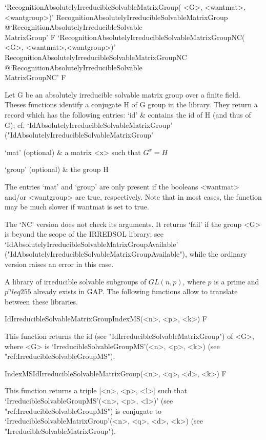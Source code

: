 \>`RecognitionAbsolutelyIrreducibleSolvableMatrixGroup(%
   <G>, <wantmat>, <wantgroup>)'%
{RecognitionAbsolutelyIrreducibleSolvableMatrixGroup}%
@{`RecognitionAbsolutelyIrreducibleSolvable\\MatrixGroup'} F
\>`RecognitionAbsolutelyIrreducibleSolvableMatrixGroupNC(%
   <G>, <wantmat>,<wantgroup>)'%
{RecognitionAbsolutelyIrreducibleSolvableMatrixGroupNC}%
@{`RecognitionAbsolutelyIrreducibleSolvable\\MatrixGroupNC'} F

Let G be an absolutely irreducible solvable matrix group over a finite field. 
Theses functions identify a conjugate H of G group in the library. 
They return a record which has the following entries:
\beginitems
`id' &  contains the id of H (and thus of
G); cf. `IdAbsolutelyIrreducibleSolvableMatrixGroup'
("IdAbsolutelyIrreducibleSolvableMatrixGroup"

`mat' (optional) &
a
matrix <x> such that $G^x = H$

`group' (optional) & the group H 

\enditems
The entries `mat' and `group' are only present if the booleans <wantmat> and/or
<wantgroup> are true, respectively. Note that in most cases, the function may 
be much slower if wantmat is set to true.  

The `NC' version does not check its arguments. It returns `fail' if
the group <G> is beyond the scope of the IRREDSOL library; see
`IdAbsolutelyIrreducibleSolvableMatrixGroupAvailable'
("IdAbsolutelyIrreducibleSolvableMatrixGroupAvailable"), while the
ordinary version raises an error in this case.



A library of irreducible solvable subgroups of $GL(n, p)$, where $p$ is a 
prime and $p^n leq 255$ already exists in GAP. The following functions
allow to translate between these libraries. 


\>IdIrreducibleSolvableMatrixGroupIndexMS(<n>, <p>, <k>) F

This function returns the id (see "IdIrreducibleSolvableMatrixGroup") of <G>, 
where <G> is `IrreducibleSolvableGroupMS'(<n>, <p>, <k>) (see "ref:IrreducibleSolvableGroupMS").


\>IndexMSIdIrreducibleSolvableMatrixGroup(<n>, <q>, <d>, <k>) F

This function returns a triple [<n>, <p>, <l>] such that
`IrreducibleSolvableGroupMS'(<n>, <p>, <l>)' (see "ref:IrreducibleSolvableGroupMS") is conjugate to
`IrreducibleSolvableMatrixGroup'(<n>, <q>, <d>, <k>) (see "IrreducibleSolvableMatrixGroup").


